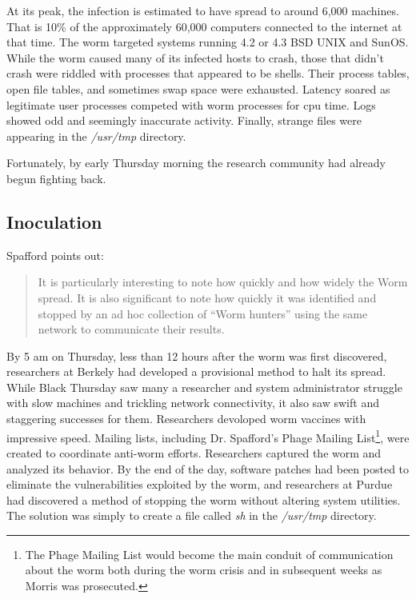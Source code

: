 At its peak, the infection is estimated to have spread to around 6,000 machines.
That is 10\% of the approximately 60,000 computers connected to the internet at
that time\cite{eichin_microscope_1989}\cite{marsan_morris_2008}. The worm
targeted systems running 4.2 or 4.3 BSD UNIX and SunOS. 
While the worm caused many of its infected hosts to crash, those that didn't
crash were riddled with processes that appeared to be shells.
Their process tables, open file tables, and sometimes swap space were exhausted.
Latency soared as legitimate user processes competed with worm processes for cpu
time. Logs showed odd and seemingly inaccurate activity. Finally, strange files
were appearing in the \textit{/usr/tmp} directory\cite{seeley_tour_1989}\cite{spafford_crisis_1989}.

Fortunately, by early Thursday morning the research community had already begun
fighting back.



\subsection*{Inoculation}

Spafford\cite{spafford_internet_1989-1} points out:
\begin{quote}
It is particularly interesting to note how quickly and how widely the Worm spread.
It is also significant to note how quickly it was identified and stopped by an
ad hoc collection of ``Worm hunters'' using the same network to communicate their
results.
\end{quote}

By 5 am on Thursday, less than 12 hours after the
worm was first discovered, researchers at Berkely had
developed a provisional method to halt its spread\cite{spafford_crisis_1989}.
While Black Thursday saw many a researcher and system administrator struggle
with slow machines and trickling network connectivity, it also saw 
swift and staggering successes for them.
Researchers devoloped worm vaccines with impressive speed. 
Mailing lists, including Dr. Spafford's Phage Mailing List\footnote{
The Phage Mailing List would become the main conduit of communication about the
worm both during the worm crisis and in subsequent weeks as Morris was
prosecuted\cite{spafford_crisis_1989}\cite{spafford_internet_1989-1}\cite{lee_washpost_2013}.
}, 
were created to coordinate anti-worm efforts.
Researchers captured the worm and analyzed its behavior. By the end of the day,
software patches had been posted to eliminate the vulnerabilities exploited by
the worm, and researchers at Purdue had discovered a
method of stopping the worm without altering
system utilities\cite{spafford_internet_1989-1}. The solution was simply to
create a file called \textit{sh} in the \textit{/usr/tmp} directory.

